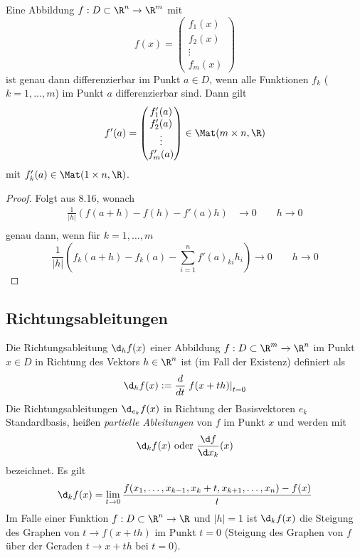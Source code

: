 \documentclass[a4paper,10pt]{scrartcl}
\begin{document}
\setcounter{thm}{0}
\begin{st}
\label{13.1}
Eine Abbildung $f:D\subset \R^n\to \R^m$ mit
\[
f(x)=\begin{pmatrix}f_1(x)\\f_2(x)\\\vdots\\f_m(x)\end{pmatrix}
\]
ist genau dann differenzierbar im Punkt $a\in D$, wenn alle Funktionen
$f_k$  ($k=1,\dotsc,m$) im Punkt $a$ differenzierbar sind.
Dann gilt
\[
f'(a)=\begin{pmatrix}f_1'(a)\\f_2'(a)\\\vdots\\f_m'(a)\end{pmatrix}\in \Mat(m\times n, \R)
\]
mit $f_k'(a)\in \Mat(1\times n, \R)$.
\begin{proof}
Folgt aus 8.16, wonach 
\begin{align*}
\frac 1{|h|}(f(a+h)-f(h)-f'(a)h) &\to 0 \qquad h\to 0\\
\end{align*}
genau dann, wenn für $k=1,\dotsc, m$
\[
\frac 1{|h|}(f_k(a+h)-f_k(a)-\sum_{i=1}^nf'(a)_{ki}h_i) \to 0 \qquad h\to 0
\]
\end{proof}
\end{st}

\subsection*{Richtungsableitungen}

Die Richtungsableitung $\d_hf(x)$ einer Abbildung $f:D\subset \R^m \to \R^n$ im Punkt $x\in D$ in 
Richtung des Vektors $h\in \R^n$ ist (im Fall der Existenz) definiert als
\[
\d_hf(x) := \frac d{dt}\left.f(x+th)\right|_{t=0}
\]
Die Richtungsableitungen $\d_{e_k}f(x)$ in Richtung der Basisvektoren
$e_k$ Standardbasis, heißen \emph{partielle Ableitungen} von $f$ im Punkt $x$ und werden mit
\[
\d_kf(x) \text{ oder } \frac {\d f}{\d x_k}(x)
\]
bezeichnet.
Es gilt
\[
		\d_kf(x)=\lim_{t\to 0}\frac {f(x_1,\dotsc,x_{k-1},x_k+t,x_{k+1},\dotsc,x_n)-f(x)}t
\]
Im Falle einer Funktion $f:D\subset \R^n\to \R$ und $|h|=1$ ist $\d_kf(x)$ die Steigung des Graphen von
$t\to f(x+th)$ im Punkt $t=0$ (Steigung des Graphen von $f$ über der Geraden $t\to x+th$ bei $t=0$).
\end{document}
